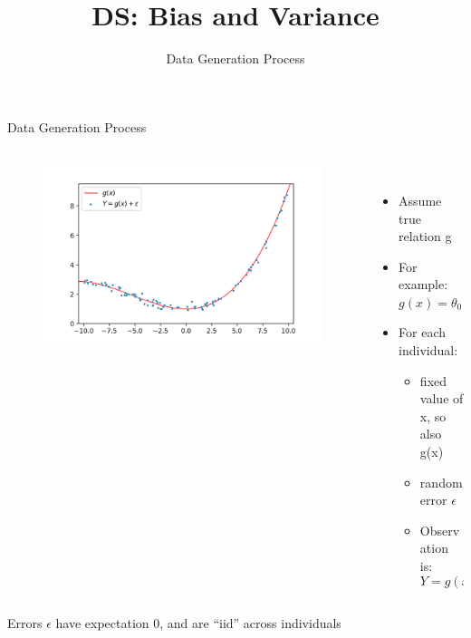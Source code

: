 \documentclass[aspectratio=169]{../latex_main/tntbeamer}  %
\title[Introduction]{DS: Bias and Variance}
\subtitle{Data Generation Process}
\begin{document}
	
	\maketitle
	\begin{frame}{Data Generation Process}
	    \begin{columns}
	        \begin{column}{.4\textwidth}
	                \begin{figure}
	                    \includegraphics[scale=.5]{Bild1}
	                \end{figure}
	        \end{column}
	        
	        
	         \begin{column}{.4\textwidth}
	            \\ \bigskip
	            \bigskip
	            \bigskip
	                \begin{itemize}
	                    \item Assume true relation g
	                    \item For example: $g(x) = \theta_0 + \theta_1x$
	                    \item For each individual:
	                    \begin{itemize}
	                        \item fixed value of x, so also g(x)
	                        \item random error $\epsilon$
	                        \item Observation is:
	                        \begin{equation*}
	                            Y = g(x) + \epsilon
	                        \end{equation*}
	                    \end{itemize}
	                \end{itemize}
	        \end{column}
	    \end{columns}
	    Errors $\epsilon$ have expectation 0, and are “iid” across individuals

	\end{frame}
	
\end{document}
